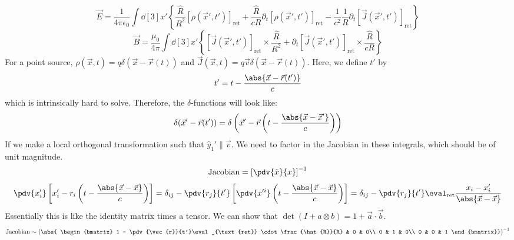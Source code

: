\documentclass[a4paper,twoside,master.tex]{subfiles}
\begin{document}

\begin{equation}
    \vec{E} = \frac{1}{4 \pi \epsilon_0} \int \dd[3]{x'} \left\{ \frac{ \hat{R}}{R^2} [\rho( \vec{x}', t')]_{\text{ret}} + \frac{ \hat{R}}{cR} \partial_t [\rho( \vec{x}', t')]_{\text{ret}} - \frac{1}{c^2} \frac{1}{R} \partial_t [ \vec{J}(\vec{x}',t')]_{\text{ret}} \right\}
\end{equation}
\begin{equation}
    \vec{B} = \frac{\mu_0}{4 \pi} \int \dd[3]{x'} \left\{ [ \vec{J}( \vec{x}', t')]_{\text{ret}} \times \frac{ \hat{R}}{R^2} + \partial_t [ \vec{J}( \vec{x}', t')]_{\text{ret}} \times \frac{ \hat{R}}{cR} \right\}
\end{equation}
For a point source, $ \rho(\vec{x},t) = q \delta(\vec{x}-\vec{r}(t)) $ and $ \vec{J}(\vec{x},t) = q\vec{v} \delta(\vec{x}-\vec{r}(t)) $. Here, we define $ t' $ by
\begin{equation}
    t' = t - \frac{\abs{ \vec{x} - \vec{r}(t')}}{c}
\end{equation}
which is intrinsically hard to solve. Therefore, the $\delta$-functions will look like:
\begin{equation}
    \delta( \vec{x}' - \vec{r}(t')) = \delta \left( \vec{x}' - \vec{r}\left( t - \frac{\abs{ \vec{x} - \vec{x}'}}{c} \right) \right)
\end{equation}
If we make a local orthogonal transformation such that $ \hat{y}_1' \parallel \vec{v} $. We need to factor in the Jacobian in these integrals, which should be of unit magnitude.
\begin{equation}
    \text{Jacobian} = \left[ \pdv{\tilde{x}}{x} \right]^{-1}
\end{equation}
\begin{equation}
    \pdv{x'_i} \left[ x'_i - r_i \left( t - \frac{\abs{\vec{x}-\vec{x}}}{c} \right) \right] = \delta_{ij} - \pdv{r_j}{t'} \left[ \pdv{x'^i}\left( t - \frac{\abs{\vec{x}-\vec{x}}}{c} \right) \right] = \delta_{ij} - \pdv{r_j}{t'}\eval_{\text{ret}} \frac{x_i - x'_i}{\abs{\vec{x}-\vec{x}}}
\end{equation}
Essentially this is like the identity matrix times a tensor. We can show that $ \det(I + a \otimes b) = 1 + \vec{a} \cdot \vec{b} $.
\begin{equation}
    \text{Jacobian} \sim \left( \abs{
        \begin{bmatrix}
            1 - \pdv{\vec{r}}{t'}\eval_{\text{ret}} \cdot \frac{\hat{R}}{R} & 0 & 0\\ 0 & 1 & 0\\ 0 & 0 & 1
    \end{bmatrix}} \right)^{-1} 
\end{equation}
\end{document}
